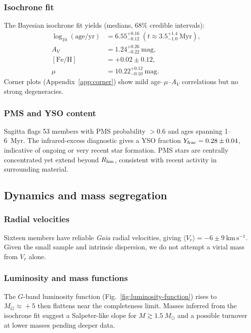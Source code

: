 \documentclass[../main.tex]{subfiles}
\begin{document}
\subsubsection{Isochrone fit}
The Bayesian isochrone fit yields (medians, 68\% credible intervals):
\begin{align*}
 \log_{10}(\mathrm{age/yr}) &= 6.55^{+0.16}_{-0.12}\;(t\approx3.5^{+1.4}_{-1.0}~\mathrm{Myr}),\\
 A_V &= 1.24^{+0.26}_{-0.22}~\mathrm{mag},\\
 \mathrm{[Fe/H]} &= +0.02\pm0.12,\\
 \mu &= 10.22^{+0.12}_{-0.10}~\mathrm{mag}.
\end{align*}
Corner plots (Appendix~\ref{app:corner}) show mild age--$\mu$--$A_V$ correlations but no strong degeneracies.

\subsubsection{PMS and YSO content}
Sagitta flags 53 members with PMS probability $>0.6$ and ages spanning 1--6~Myr. The infrared-excess diagnostic gives a YSO fraction $Y_{\rm frac}=0.28\pm0.04$, indicative of ongoing or very recent star formation. PMS stars are centrally concentrated yet extend beyond $R_{\rm hm}$, consistent with recent activity in surrounding material.

\subsection{Dynamics and mass segregation}
\label{subsec:results-dynamics}

\subsubsection{Radial velocities}
Sixteen members have reliable \textit{Gaia} radial velocities, giving
$\langle V_r\rangle=-6\pm9~\mathrm{km\,s^{-1}}$.
Given the small sample and intrinsic dispersion, we do not attempt a virial mass from $V_r$ alone.

\subsubsection{Luminosity and mass functions}
The $G$-band luminosity function (Fig.~\ref{fig:luminosity-function}) rises to $M_G\!\approx\!+5$ then flattens near the completeness limit. Masses inferred from the isochrone fit suggest a Salpeter-like slope for $M\gtrsim1.5~M_\odot$ and a possible turnover at lower masses pending deeper data.
\end{document}
